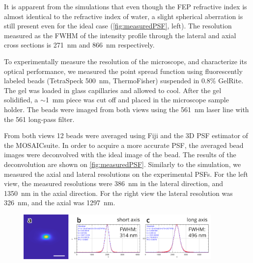     It is apparent from the simulations that even though the FEP refractive index is almost identical to the refractive index of water, a slight spherical aberration is still present even for the ideal case (\autoref{fig:measuredPSF}, left). The resolution measured as the FWHM of the intensity profile through the lateral and axial cross sections is \SI{271}{nm} and \SI{866}{nm} respectively.

    To experimentally measure the resolution of the microscope, and characterize its optical performance, we measured the point spread function using fluorescently labeled beads (TetraSpeck \SI{500}{nm}, ThermoFisher) suspended in 0.8\% GelRite. The gel was loaded in glass capillaries and allowed to cool. After the gel solidified, a $\sim$\SI{1}{mm} piece was cut off and placed in the microscope sample holder. The beads were imaged from both views using the \SI{561}{nm} laser line with the 561 long-pass filter.

    From both views 12 beads were averaged using Fiji and the 3D PSF estimator of the MOSAICsuite. In order to acquire a more accurate PSF, the averaged bead images were deconvolved with the ideal image of the bead. The results of the deconvolution are shown on \autoref{fig:measuredPSF}. Similarly to the simulation, we measured the axial and lateral resolutions on the experimental PSFs. For the left view, the measured resolutions were \SI{386}{nm} in the lateral direction, and \SI{1350}{nm} in the axial direction. For the right view the lateral resolution was \SI{326}{nm}, and the axial was \SI{1297}{nm}.

    \begin{figure}
      \centering
      \includegraphics[width=0.9\textwidth]{beads/fusedPSF}
      \label{fig:fusedPSF}
    \end{figure}
    
